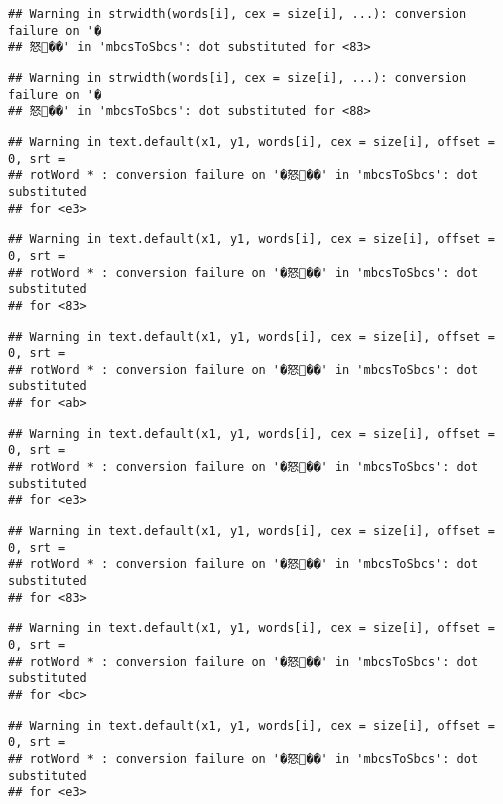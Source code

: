 \documentclass[]{article}
\begin{document}
\begin{verbatim}
## Warning in strwidth(words[i], cex = size[i], ...): conversion failure on '�
## 怒��' in 'mbcsToSbcs': dot substituted for <83>
\end{verbatim}

\begin{verbatim}
## Warning in strwidth(words[i], cex = size[i], ...): conversion failure on '�
## 怒��' in 'mbcsToSbcs': dot substituted for <88>
\end{verbatim}

\begin{verbatim}
## Warning in text.default(x1, y1, words[i], cex = size[i], offset = 0, srt =
## rotWord * : conversion failure on '�怒��' in 'mbcsToSbcs': dot substituted
## for <e3>
\end{verbatim}

\begin{verbatim}
## Warning in text.default(x1, y1, words[i], cex = size[i], offset = 0, srt =
## rotWord * : conversion failure on '�怒��' in 'mbcsToSbcs': dot substituted
## for <83>
\end{verbatim}

\begin{verbatim}
## Warning in text.default(x1, y1, words[i], cex = size[i], offset = 0, srt =
## rotWord * : conversion failure on '�怒��' in 'mbcsToSbcs': dot substituted
## for <ab>
\end{verbatim}

\begin{verbatim}
## Warning in text.default(x1, y1, words[i], cex = size[i], offset = 0, srt =
## rotWord * : conversion failure on '�怒��' in 'mbcsToSbcs': dot substituted
## for <e3>
\end{verbatim}

\begin{verbatim}
## Warning in text.default(x1, y1, words[i], cex = size[i], offset = 0, srt =
## rotWord * : conversion failure on '�怒��' in 'mbcsToSbcs': dot substituted
## for <83>
\end{verbatim}

\begin{verbatim}
## Warning in text.default(x1, y1, words[i], cex = size[i], offset = 0, srt =
## rotWord * : conversion failure on '�怒��' in 'mbcsToSbcs': dot substituted
## for <bc>
\end{verbatim}

\begin{verbatim}
## Warning in text.default(x1, y1, words[i], cex = size[i], offset = 0, srt =
## rotWord * : conversion failure on '�怒��' in 'mbcsToSbcs': dot substituted
## for <e3>
\end{verbatim}
\end{document}
